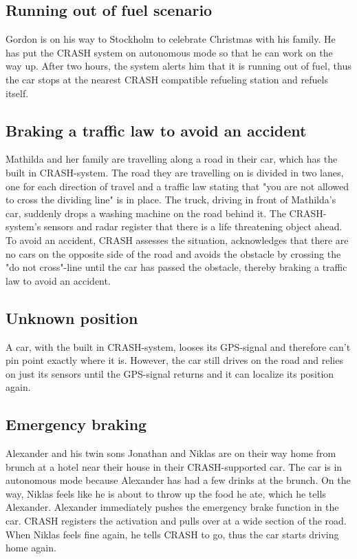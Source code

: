 \documentclass{article}
\begin{document}
\subsection {Running out of fuel scenario}
Gordon is on his way to Stockholm to celebrate Christmas with his family. He has put the CRASH system on autonomous mode so that he can work on the way up. After two hours, the system alerts him that it is running out of fuel, thus the car stops at the nearest CRASH compatible refueling station and refuels itself.

\subsection {Braking a traffic law to avoid an accident}
Mathilda and her family are travelling along a road in their car, which has the built in CRASH-system. The road they are travelling on is divided in two lanes, one for each direction of travel and a traffic law stating that "you are not allowed to cross the dividing line" is in place. The truck, driving in front of Mathilda's car, suddenly drops a washing machine on the road behind it. The CRASH-system's sensors and radar register that there is a life threatening object ahead. To avoid an accident, CRASH assesses the situation, acknowledges that there are no cars on the opposite side of the road and avoids the obstacle by crossing the "do not cross"-line until the car has passed the obstacle, thereby braking a traffic law to avoid an accident.

\subsection {Unknown position}
A car, with the built in CRASH-system, looses its GPS-signal and therefore can't pin point exactly where it is. However, the car still drives on the road and relies on just its sensors until the GPS-signal returns and it can localize its position again.

\subsection {Emergency braking}
Alexander and his twin sons Jonathan and Niklas are on their way home from brunch at a hotel near their house in their CRASH-supported car. The car is in autonomous mode because Alexander has had a few drinks at the brunch. On the way, Niklas feels like he is about to throw up the food he ate, which he tells Alexander. Alexander immediately pushes the emergency brake function in the car. CRASH registers the activation and pulls over at a wide section of the road. When Niklas feels fine again, he tells CRASH to go, thus the car starts driving home again. 
\end{document}
